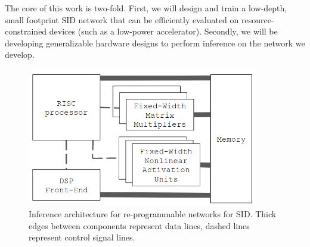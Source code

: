 \documentclass[journal,12pt,onecolumn,draftclsnofoot,]{sty/IEEEtran}
\begin{document}
The core of this work is two-fold. First, we will design and train a low-depth, small footprint SID network that can be efficiently evaluated on resource-constrained devices (such as a low-power accelerator). Secondly, we will be developing generalizable hardware designs to perform inference on the network we develop.

\begin{figure}
\centering
\includegraphics[width=0.9\textwidth]{figs/architecture.png}
\caption{Inference architecture for re-programmable networks for SID. Thick edges between components represent data lines, dashed lines represent control signal lines.}
\label{architecture}
\end{figure}
\end{document}
